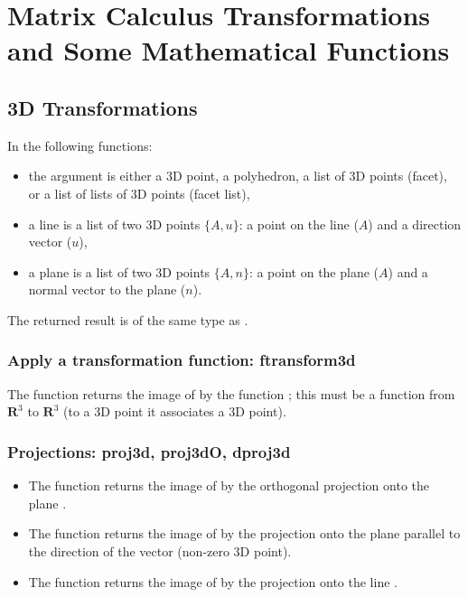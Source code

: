\section{Matrix Calculus Transformations and Some Mathematical Functions}

\subsection{3D Transformations}

In the following functions:
\begin{itemize}
\item the argument  is either a 3D point, a polyhedron, a list of 3D points (facet), or a list of lists of 3D points (facet list),
\item a line  is a list of two 3D points $\{A,u\}$: a point on the line ($A$) and a direction vector ($u$),
\item a plane  is a list of two 3D points $\{A,n\}$: a point on the plane ($A$) and a normal vector to the plane ($n$).
\end{itemize}
The returned result is of the same type as .

\subsubsection{Apply a transformation function: ftransform3d}

The function  returns the image of  by the function ; this must be a function from $\mathbf R^3$ to $\mathbf R^3$ (to a 3D point it associates a 3D point).

\subsubsection{Projections: proj3d, proj3dO, dproj3d}

\begin{itemize}
\item The function  returns the image of  by the orthogonal projection onto the plane .
\item The function  returns the image of  by the projection onto the plane  parallel to the direction of the vector  (non-zero 3D point).
\item The function  returns the image of  by the projection onto the line .
\end{itemize}

